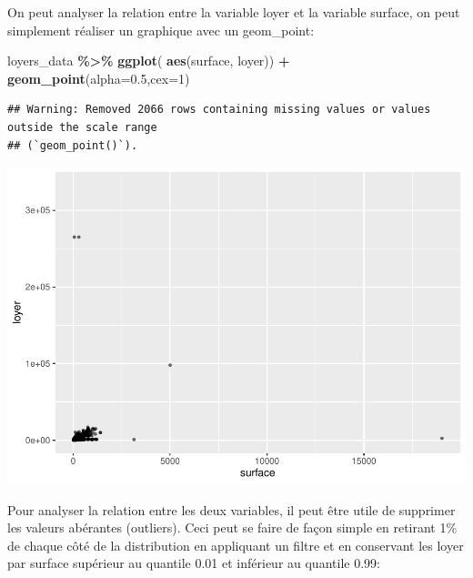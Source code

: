 \documentclass[
]{book}
\newenvironment{Shaded}{\begin{snugshade}}{\end{snugshade}}
\newcommand{\AttributeTok}[1]{\textcolor[rgb]{0.13,0.29,0.53}{#1}}
\newcommand{\DecValTok}[1]{\textcolor[rgb]{0.00,0.00,0.81}{#1}}
\newcommand{\FloatTok}[1]{\textcolor[rgb]{0.00,0.00,0.81}{#1}}
\newcommand{\FunctionTok}[1]{\textcolor[rgb]{0.13,0.29,0.53}{\textbf{#1}}}
\newcommand{\NormalTok}[1]{#1}
\newcommand{\SpecialCharTok}[1]{\textcolor[rgb]{0.81,0.36,0.00}{\textbf{#1}}}
\begin{document}
On peut analyser la relation entre la variable loyer et la variable
surface, on peut simplement réaliser un graphique avec un geom\_point:

\begin{Shaded}
\begin{Highlighting}[]
\NormalTok{loyers\_data }\SpecialCharTok{\%\textgreater{}\%}
\FunctionTok{ggplot}\NormalTok{( }\FunctionTok{aes}\NormalTok{(surface, loyer)) }\SpecialCharTok{+}
  \FunctionTok{geom\_point}\NormalTok{(}\AttributeTok{alpha=}\FloatTok{0.5}\NormalTok{,}\AttributeTok{cex=}\DecValTok{1}\NormalTok{)}
\end{Highlighting}
\end{Shaded}

\begin{verbatim}
## Warning: Removed 2066 rows containing missing values or values outside the scale range
## (`geom_point()`).
\end{verbatim}

\includegraphics{bookdown-demo_files/figure-latex/unnamed-chunk-4-1.pdf}

Pour analyser la relation entre les deux variables, il peut être utile
de supprimer les valeurs abérantes (outliers). Ceci peut se faire de
façon simple en retirant 1\% de chaque côté de la distribution en
appliquant un filtre et en conservant les loyer par surface supérieur au
quantile 0.01 et inférieur au quantile 0.99:
\end{document}
